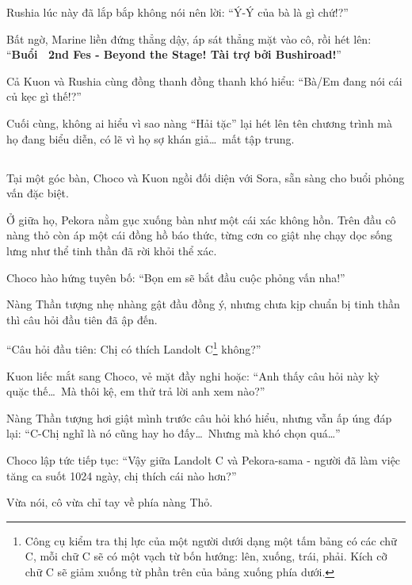 \documentclass[../main.tex]{subfiles}
\begin{document}
Rushia lúc này đã lắp bắp không nói nên lời: ``Ý-Ý của bà là gì chứ!?''

Bất ngờ, Marine liền đứng thẳng dậy, áp sát thẳng mặt vào cô, rồi hét lên: ``\textbf{Buổi \hll\ 2nd Fes - Beyond the Stage! Tài trợ bởi Bushiroad!}''

Cả Kuon và Rushia cùng đồng thanh đồng thanh khó hiểu: ``Bà/Em đang nói cái củ kẹc gì thế!?''

Cuối cùng, không ai hiểu vì sao nàng ``Hải tặc'' lại hét lên tên chương trình mà họ đang biểu diễn, có lẽ vì họ sợ khán giả\dots\ mất tập trung.

\subsection*{\label{ep-S13.II}}

Tại một góc bàn, Choco và Kuon ngồi đối diện với Sora, sẵn sàng cho buổi phỏng vấn đặc biệt.

Ở giữa họ, Pekora nằm gục xuống bàn như một cái xác không hồn. Trên đầu cô nàng thỏ còn áp một cái đồng hồ báo thức, từng cơn co giật nhẹ chạy dọc sống lưng như thể tinh thần đã rời khỏi thể xác.

Choco hào hứng tuyên bố: ``Bọn em sẽ bắt đầu cuộc phỏng vấn nha!''

Nàng Thần tượng nhẹ nhàng gật đầu đồng ý, nhưng chưa kịp chuẩn bị tinh thần thì câu hỏi đầu tiên đã ập đến.

``Câu hỏi đầu tiên: Chị có thích Landolt C\footnote{Công cụ kiểm tra thị lực của một người dưới dạng một tấm bảng có các chữ C, mỗi chữ C sẽ có một vạch từ bốn hướng: lên, xuống, trái, phải. Kích cỡ chữ C sẽ giảm xuống từ phần trên của bảng xuống phía dưới.} không?''


Kuon liếc mắt sang Choco, vẻ mặt đầy nghi hoặc: ``Anh thấy câu hỏi này kỳ quặc thế\dots\ Mà thôi kệ, em thử trả lời anh xem nào?''

Nàng Thần tượng hơi giật mình trước câu hỏi khó hiểu, nhưng vẫn ấp úng đáp lại: ``C-Chị nghĩ là nó cũng hay ho đấy\dots\ Nhưng mà khó chọn quá\dots''

Choco lập tức tiếp tục: ``Vậy giữa Landolt C và Pekora-sama - người đã làm việc tăng ca suốt 1024 ngày, chị thích cái nào hơn?''

Vừa nói, cô vừa chỉ tay về phía nàng Thỏ.
\end{document}
